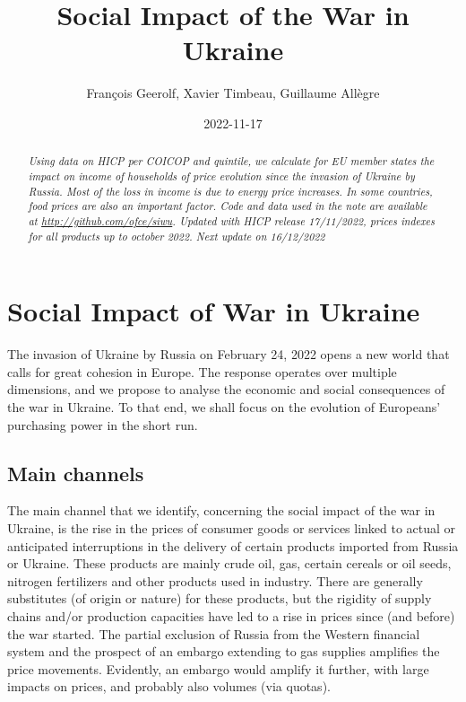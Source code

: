 \documentclass[
  9pt,
  a4paper,
  numbers=noendperiod,
  DIV=12]{scrartcl}
\title{Social Impact of the War in Ukraine}
\author{François Geerolf, Xavier Timbeau, Guillaume Allègre}
\date{2022-11-17}
\renewcommand*\contentsname{Table of contents}
\newcommand\contentsname{Table of contents}
\begin{document}
\maketitle
\begin{abstract}
\emph{Using data on HICP per COICOP and quintile, we calculate for EU
member states the impact on income of households of price evolution
since the invasion of Ukraine by Russia. Most of the loss in income is
due to energy price increases. In some countries, food prices are also
an important factor. Code and data used in the note are available at
\url{http://github.com/ofce/siwu}. Updated with HICP release 17/11/2022,
prices indexes for all products up to october 2022. Next update on
16/12/2022}
\end{abstract}
\ifdefined\Shaded\renewenvironment{Shaded}{\begin{tcolorbox}[sharp corners, interior hidden, breakable, enhanced, borderline west={3pt}{0pt}{shadecolor}, boxrule=0pt, frame hidden]}{\end{tcolorbox}}\fi

\renewcommand*\contentsname{Table of contents}
{
\hypersetup{linkcolor=}
\setcounter{tocdepth}{1}
\tableofcontents
}
\hypertarget{social-impact-of-war-in-ukraine}{%
\section{Social Impact of War in
Ukraine}\label{social-impact-of-war-in-ukraine}}

The invasion of Ukraine by Russia on February 24, 2022 opens a new world
that calls for great cohesion in Europe. The response operates over
multiple dimensions, and we propose to analyse the economic and social
consequences of the war in Ukraine. To that end, we shall focus on the
evolution of Europeans' purchasing power in the short run.

\hypertarget{main-channels}{%
\subsection{Main channels}\label{main-channels}}

The main channel that we identify, concerning the social impact of the
war in Ukraine, is the rise in the prices of consumer goods or services
linked to actual or anticipated interruptions in the delivery of certain
products imported from Russia or Ukraine. These products are mainly
crude oil, gas, certain cereals or oil seeds, nitrogen fertilizers and
other products used in industry. There are generally substitutes (of
origin or nature) for these products, but the rigidity of supply chains
and/or production capacities have led to a rise in prices since (and
before) the war started. The partial exclusion of Russia from the
Western financial system and the prospect of an embargo extending to gas
supplies amplifies the price movements. Evidently, an embargo would
amplify it further, with large impacts on prices, and probably also
volumes (via quotas).
\end{document}
